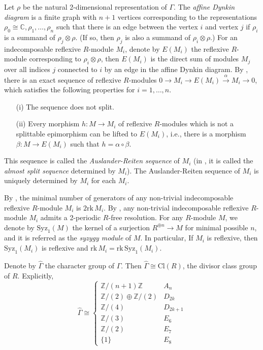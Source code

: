 \documentclass{amsart}[12pt]
\theoremstyle{definition}
\theoremstyle{remark}
\numberwithin{equation}{section}
\begin{document}
Let $\rho$ be the natural 2-dimensional representation of $\Gamma$. The \textit{affine Dynkin diagram} is a finite graph with $n + 1$ vertices corresponding to the representations $\rho_0 \cong \mathbb{C}, \rho_1, \dots, \rho_n$ such that there is an edge between the vertex $i$ and vertex $j$ if $\rho_i$ is a summand of $\rho_j \otimes \rho$. (If so, then $\rho_j$ is also a summand of $\rho_i \otimes \rho$.) For an indecomposable reflexive $R$-module $M_i$, denote by $E(M_i)$ the reflexive $R$-module corresponding to $\rho_i \otimes \rho$, then $E(M_i)$ is the direct sum of modules $M_j$ over all indices $j$ connected to $i$ by an edge in the affine Dynkin diagram. By \cite[Proposition 3.2]{A86}, there is an exact sequence of reflexive $R$-modules $0 \to M_i \to E(M_i) \xrightarrow{\alpha} M_i \to 0$, which satisfies the following properties for $i = 1, \dots, n$. 
\begin{itemize}
\item[(i)] The sequence does not split.
\item[(ii)] Every morphism $h: M \to M_i$ of reflexive $R$-modules which is not a splittable epimorphism can be lifted to $E(M_i)$, i.e., there is a morphism $\beta: M \to E(M_i)$ such that $h = \alpha \circ \beta$.
\end{itemize}

This sequence is called the \textit{Auslander-Reiten sequence} of $M_i$ (in \cite{A86}, it is called the \textit{almost split sequence} determined by $M_i$). The Auslander-Reiten sequence of $M_i$ is uniquely determined by $M_i$ for each $M_i$. 

By \cite[Corollary 1.3]{HK}, the minimal number of generators of any non-trivial indecomposable reflexive $R$-module $M_i$ is $2 \mathrm{rk}\, M_i$. By \cite[Theorem 6.1(ii)]{E80}, any non-trivial indecomposable reflexive $R$-module $M_i$ admits a 2-periodic $R$-free resolution. For any $R$-module $M$, we denote by $\mathrm{Syz}_1(M)$ the kernel of a surjection $R^{\oplus n} \to M$ for minimal possible $n$, and it is referred as the \textit{syzygy module} of $M$. In particular, If $M_i$ is reflexive, then $\mathrm{Syz}_1(M_i)$ is reflexive and $\mathrm{rk}\, M_i = \mathrm{rk}\, \mathrm{Syz}_1(M_i)$.

Denote by $\hat{\Gamma}$ the character group of $\Gamma$. Then $\hat{\Gamma} \cong \mathrm{Cl}(R)$, the divisor class group of $R$. Explicitly, 
\[
\hat{\Gamma} \cong \begin{cases}
\mathbb{Z}/(n + 1)\mathbb{Z} & A_n \\
\mathbb{Z}/(2) \oplus \mathbb{Z}/(2) & D_{2k} \\
\mathbb{Z}/(4) & D_{2k + 1} \\
\mathbb{Z}/(3) & E_6 \\
\mathbb{Z}/(2) & E_7 \\
\{1\} & E_8
\end{cases}
\]
\end{document}

